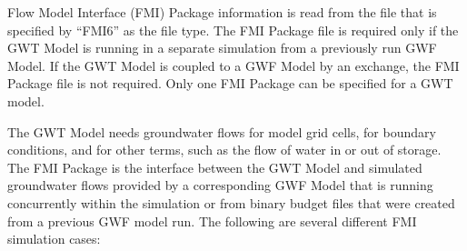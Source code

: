 Flow Model Interface (FMI) Package information is read from the file that is specified by ``FMI6'' as the file type. The FMI Package file is required only if the GWT Model is running in a separate simulation from a previously run GWF Model. If the GWT Model is coupled to a GWF Model by an exchange, the FMI Package file is not required. Only one FMI Package can be specified for a GWT model.

The GWT Model needs groundwater flows for model grid cells, for boundary conditions, and for other terms, such as the flow of water in or out of storage.  The FMI Package is the interface between the GWT Model and simulated groundwater flows provided by a corresponding GWF Model that is running concurrently within the simulation or from binary budget files that were created from a previous GWF model run.  The following are several different FMI simulation cases:

